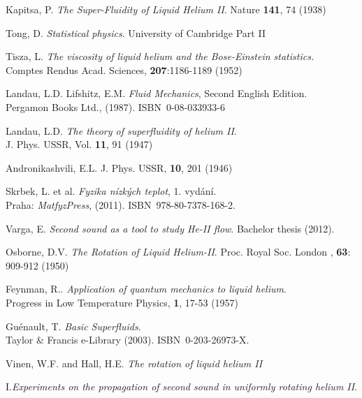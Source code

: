 
\def\bibname{Bibliography}
\begin{thebibliography}{99}
	\addcontentsline{toc}{chapter}{\bibname}

{\sc Kapitsa, P.}
\emph{The Super-Fluidity of Liquid Helium II}.
Nature \textbf{141}, 74 (1938)

{\sc Tong, D.}
\emph{Statistical physics}.
University of Cambridge Part II

{\sc Tisza, L.}
\emph{The viscosity of liquid helium and the Bose-Einstein statistics.}\\
Comptes Rendus Acad. Sciences, \textbf{207}:1186-1189 (1952)

{\sc Landau, L.D.}  {\sc Lifshitz, E.M.}
\emph{Fluid Mechanics}, Second English Edition.\\
Pergamon Books Ltd., (1987). \mbox{ISBN~0-08-033933-6}

{\sc Landau, L.D.}
\emph{The theory of superfluidity of helium II}.\\
J. Phys. USSR, Vol. \textbf{11}, 91 (1947)

{\sc Andronikashvili, E.L.}
J. Phys. USSR, \textbf{10}, 201 (1946)

{\sc Skrbek, L.} et al.
\emph{Fyzika nízkých teplot}, 1. vydání.\\
Praha: {\sl MatfyzPress}, (2011). \mbox{ISBN~978-80-7378-168-2}.

{\sc Varga, E.}
\emph{Second sound as a tool to study He-II flow}.
Bachelor thesis (2012).

{\sc Osborne, D.V.}
\emph{The Rotation of Liquid Helium-II}.
Proc. Royal Soc. London , \textbf{63}: 909-912 (1950)

{\sc Feynman, R.}.
\emph{Application of quantum mechanics to liquid helium}.\\
Progress in Low Temperature Physics, \textbf{1}, 17-53 (1957)

{\sc Guénault, T.}
\emph{Basic Superfluids}.\\
Taylor $\&$ Francis e-Library (2003). ISBN~0-203-26973-X.

{\sc Vinen, W.F.} and {\sc Hall, H.E.}
\emph{The rotation of liquid helium II}

I.\hspace{2mm}\emph{Experiments on the propagation of second sound in uniformly rotating helium II}.


\end{thebibliography}
